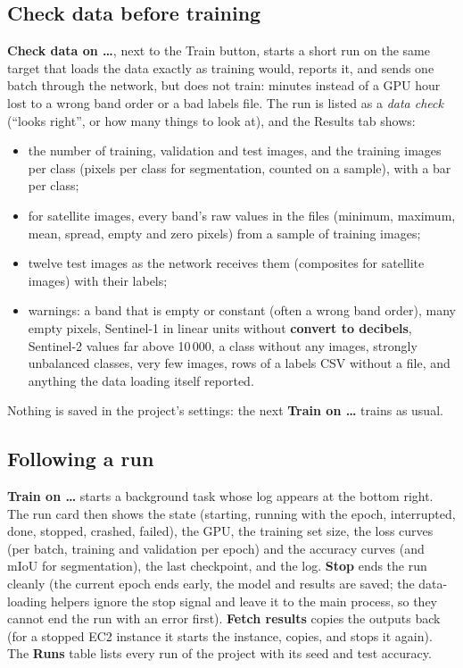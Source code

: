 \documentclass[11pt,a4paper]{article}
\newcommand{\ui}[1]{\textbf{\textsf{#1}}}
\begin{document}
\subsection{Check data before training}
\label{sec:check-data}
\ui{Check data on \ldots}, next to the Train button, starts a short run on the same target that loads the data exactly as training would,
reports it, and sends one batch through the network, but does not train: minutes instead of a GPU hour lost to a wrong band order or a
bad labels file. The run is listed as a \emph{data check} (``looks right'', or how many things to look at), and the Results tab shows:
\begin{itemize}[nosep]
  \item the number of training, validation and test images, and the training images per class (pixels per class for segmentation,
        counted on a sample), with a bar per class;
  \item for satellite images, every band's raw values in the files (minimum, maximum, mean, spread, empty and zero pixels) from a
        sample of training images;
  \item twelve test images as the network receives them (composites for satellite images) with their labels;
  \item warnings: a band that is empty or constant (often a wrong band order), many empty pixels, Sentinel-1 in linear units without
        \ui{convert to decibels}, Sentinel-2 values far above 10\,000, a class without any images, strongly unbalanced classes, very few
        images, rows of a labels CSV without a file, and anything the data loading itself reported.
\end{itemize}
Nothing is saved in the project's settings: the next \ui{Train on \ldots} trains as usual.

\subsection{Following a run}
\ui{Train on \ldots} starts a background task whose log appears at the bottom right. The run card then shows the state (starting,
running with the epoch, interrupted, done, stopped, crashed, failed), the GPU, the training set size, the loss curves (per batch, training
and validation per epoch) and the accuracy curves (and mIoU for segmentation), the last checkpoint, and the log. \ui{Stop} ends the run
cleanly (the current epoch ends early, the model and results are saved; the data-loading helpers ignore the stop signal and leave it
to the main process, so they cannot end the run with an error first). \ui{Fetch results} copies the outputs back (for a stopped EC2
instance it starts the instance, copies, and stops it again). The \ui{Runs} table lists every run of the project with its seed and test accuracy.
\end{document}
